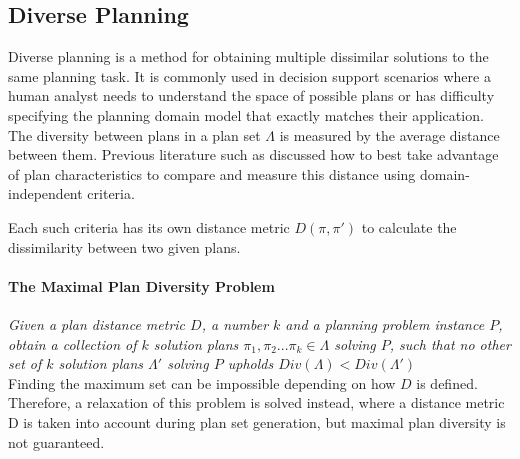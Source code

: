 \subsection{Diverse Planning}
\label{background: Diverse}
Diverse planning is a method for obtaining multiple dissimilar solutions to the same planning task. It is commonly used in decision support scenarios where a human analyst needs to understand the space of possible plans or has difficulty specifying the planning domain model that exactly matches their application. The diversity between plans in a plan set $\Lambda$ is measured by the average distance between them. Previous literature such as \cite{bryce2014landmark} discussed how to best take advantage of plan characteristics to compare and measure this distance using domain-independent criteria.





Each such criteria has its own distance metric $D(\pi,\pi')$ to calculate the dissimilarity between two given plans. 

\paragraph{The Maximal Plan Diversity Problem}
\textit{Given a plan distance metric $D$, a number $k$ and a planning problem instance $P$, obtain a collection of $k$ solution plans $\pi_1, \pi_2...\pi_k \in \Lambda$ solving $P$, such that no other set of $k$ solution plans $\Lambda'$ solving $P$ upholds $Div(\Lambda) < Div(\Lambda')$ } 
\\
Finding the maximum set can be impossible depending on how $D$ is defined\cite{Coman2011GeneratingMetrics}. Therefore, a relaxation of this problem is solved instead, where a distance metric D is taken into account during plan set generation, but maximal plan diversity is not guaranteed.

